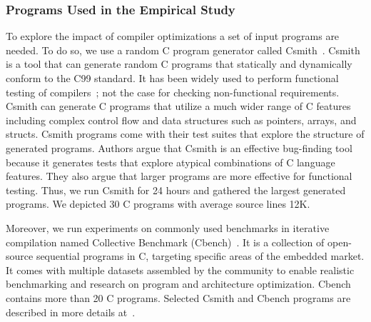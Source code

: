 \subsubsection{Programs Used in the Empirical Study}
To explore the impact of compiler optimizations a set of input programs are needed. 
To do so, we use a random C program generator called Csmith~\cite{yang2011finding}.
Csmith is a tool that can generate random C programs that statically and dynamically conform to the C99 standard. It has been widely used to perform functional testing of compilers~\cite{le2014compiler,nagai2013scaling}; not the case for checking non-functional requirements. Csmith can generate C programs that utilize a much wider range of C features including complex control flow and data structures such as pointers, arrays, and structs. Csmith programs come with their test suites that explore the structure of generated programs. 
Authors argue that Csmith is an effective bug-finding tool because it generates tests that explore atypical combinations of C language features. They also argue that larger programs are more effective for functional testing. Thus, we run Csmith for 24 hours and gathered the largest generated programs. We depicted 30 C programs with average source lines 12K.

Moreover, we run experiments on commonly used benchmarks in iterative compilation named Collective Benchmark (Cbench)~\cite{fursin2009collective}. It is a collection of open-source sequential programs in C, targeting specific areas of the embedded market. It comes with multiple datasets assembled by the community to enable realistic benchmarking and research on program and architecture optimization. Cbench contains more than 20 C programs. Selected Csmith and Cbench programs are described in more details at~\cite{mboussaa}.

